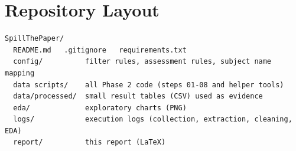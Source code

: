 \documentclass[11pt,a4paper]{article}
\begin{document}
\section{Repository Layout}
\label{app:repo}
\begin{verbatim}
SpillThePaper/
  README.md   .gitignore   requirements.txt
  config/          filter rules, assessment rules, subject name mapping
  data scripts/    all Phase 2 code (steps 01-08 and helper tools)
  data/processed/  small result tables (CSV) used as evidence
  eda/             exploratory charts (PNG)
  logs/            execution logs (collection, extraction, cleaning, EDA)
  report/          this report (LaTeX)
\end{verbatim}
\end{document}
